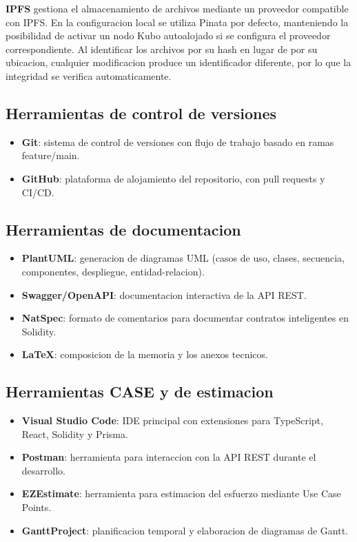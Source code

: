 \documentclass[11pt, a4paper]{article}
\begin{document}
\noindent \textbf{IPFS} gestiona el almacenamiento de archivos mediante un proveedor compatible con IPFS. En la configuracion local se utiliza Pinata por defecto, manteniendo la posibilidad de activar un nodo Kubo autoalojado si se configura el proveedor correspondiente. Al identificar los archivos por su hash en lugar de por su ubicacion, cualquier modificacion produce un identificador diferente, por lo que la integridad se verifica automaticamente.

\subsection{Herramientas de control de versiones}

\begin{itemize}
    \item \textbf{Git}: sistema de control de versiones con flujo de trabajo basado en ramas feature/main.
    \item \textbf{GitHub}: plataforma de alojamiento del repositorio, con pull requests y CI/CD.
\end{itemize}

\subsection{Herramientas de documentacion}

\begin{itemize}
    \item \textbf{PlantUML}: generacion de diagramas UML (casos de uso, clases, secuencia, componentes, despliegue, entidad-relacion).
    \item \textbf{Swagger/OpenAPI}: documentacion interactiva de la API REST.
    \item \textbf{NatSpec}: formato de comentarios para documentar contratos inteligentes en Solidity.
    \item \textbf{\LaTeX}: composicion de la memoria y los anexos tecnicos.
\end{itemize}

\subsection{Herramientas CASE y de estimacion}

\begin{itemize}
    \item \textbf{Visual Studio Code}: IDE principal con extensiones para TypeScript, React, Solidity y Prisma.
    \item \textbf{Postman}: herramienta para interaccion con la API REST durante el desarrollo.
    \item \textbf{EZEstimate}: herramienta para estimacion del esfuerzo mediante Use Case Points.
    \item \textbf{GanttProject}: planificacion temporal y elaboracion de diagramas de Gantt.
\end{itemize}
\end{document}
